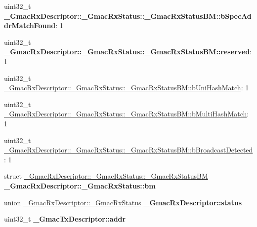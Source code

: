 \begin{DoxyCompactItemize}
\item 
\mbox{\label{group__gmac__defines_ga9c2e42016e9eaa22cf96e34d0cb421c7}} 
uint32\+\_\+t {\bfseries \+\_\+\+Gmac\+Rx\+Descriptor\+::\+\_\+\+Gmac\+Rx\+Status\+::\+\_\+\+Gmac\+Rx\+Status\+B\+M\+::b\+Spec\+Addr\+Match\+Found}\+: 1
\item 
\mbox{\label{group__gmac__defines_ga3d1bffa3790f32cbc6825016019e6cd5}} 
uint32\+\_\+t {\bfseries \+\_\+\+Gmac\+Rx\+Descriptor\+::\+\_\+\+Gmac\+Rx\+Status\+::\+\_\+\+Gmac\+Rx\+Status\+B\+M\+::reserved}\+: 1
\item 
uint32\+\_\+t \mbox{\hyperlink{group__gmac__defines_ga15f690063c4de67bb75d99a78ce9ed77}{\+\_\+\+Gmac\+Rx\+Descriptor\+::\+\_\+\+Gmac\+Rx\+Status\+::\+\_\+\+Gmac\+Rx\+Status\+B\+M\+::b\+Uni\+Hash\+Match}}\+: 1
\item 
uint32\+\_\+t \mbox{\hyperlink{group__gmac__defines_gabce6f7c6f0579197591a3e606dfe292f}{\+\_\+\+Gmac\+Rx\+Descriptor\+::\+\_\+\+Gmac\+Rx\+Status\+::\+\_\+\+Gmac\+Rx\+Status\+B\+M\+::b\+Multi\+Hash\+Match}}\+: 1
\item 
uint32\+\_\+t \mbox{\hyperlink{group__gmac__defines_ga7384907699406fb05731360bdfc7866c}{\+\_\+\+Gmac\+Rx\+Descriptor\+::\+\_\+\+Gmac\+Rx\+Status\+::\+\_\+\+Gmac\+Rx\+Status\+B\+M\+::b\+Broadcast\+Detected}}\+: 1
\item 
\mbox{\label{group__gmac__defines_gaa231c9446e24d3a1a0106b5381816907}} 
struct \mbox{\hyperlink{struct__GmacRxDescriptor_1_1__GmacRxStatus_1_1__GmacRxStatusBM}{\+\_\+\+Gmac\+Rx\+Descriptor\+::\+\_\+\+Gmac\+Rx\+Status\+::\+\_\+\+Gmac\+Rx\+Status\+BM}} {\bfseries \+\_\+\+Gmac\+Rx\+Descriptor\+::\+\_\+\+Gmac\+Rx\+Status\+::bm}
\item 
\mbox{\label{group__gmac__defines_gadaad4babaaa62382264df6c735004c16}} 
union \mbox{\hyperlink{union__GmacRxDescriptor_1_1__GmacRxStatus}{\+\_\+\+Gmac\+Rx\+Descriptor\+::\+\_\+\+Gmac\+Rx\+Status}} {\bfseries \+\_\+\+Gmac\+Rx\+Descriptor\+::status}
\item 
\mbox{\label{group__gmac__defines_ga1efc3d96eaa9479eac704f6a85c6b569}} 
uint32\+\_\+t {\bfseries \+\_\+\+Gmac\+Tx\+Descriptor\+::addr}
\item 
\mbox{\label{group__gmac__defines_ga70b6d6df85a6028a202c041f07354210}} 

\end{DoxyCompactItemize}
